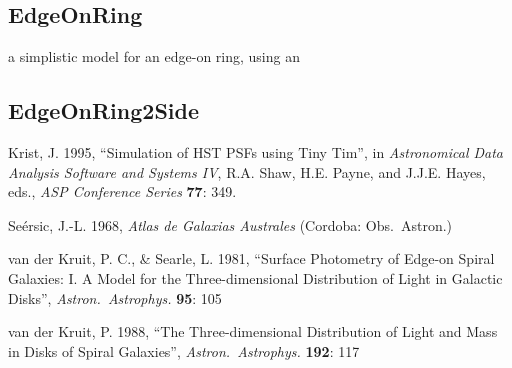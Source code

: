 \documentclass[10pt]{article}
\begin{document}
\subsection{EdgeOnRing}

a simplistic model for an edge-on ring, using an


\subsection{EdgeOnRing2Side}






\begin{thebibliography}{}

 Krist, J. 1995, ``Simulation of HST PSFs using Tiny Tim'', 
in \textit{Astronomical Data Analysis Software and Systems IV}, 
R.A. Shaw, H.E. Payne, and J.J.E. Hayes, eds., \textit{ASP Conference Series} \textbf{77}: 349.

 Se{\'e}rsic, J.-L. 1968, \textit{Atlas de 
Galaxias Australes} (Cordoba: Obs.\ Astron.)

 van der Kruit, P. C., \&
Searle, L. 1981, ``Surface Photometry of Edge-on Spiral Galaxies: I. A
Model for the Three-dimensional Distribution of Light in Galactic
Disks'', \textit{Astron.\ Astrophys.} \textbf{95}: 105

 van der Kruit, P. 1988, ``The
Three-dimensional Distribution of Light and Mass in Disks of Spiral
Galaxies'', \textit{Astron.\ Astrophys.} \textbf{192}: 117


\end{thebibliography}
%
\end{document}
